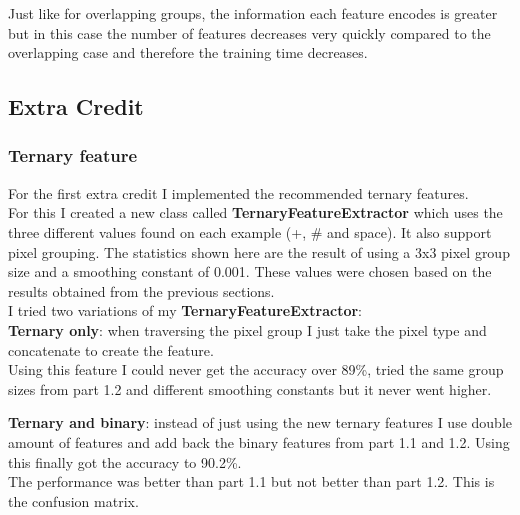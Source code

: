\documentclass[11pt]{article}
\begin{document}
Just like for overlapping groups, the information each feature encodes is greater but in this case the number of features decreases very quickly compared to the overlapping case and therefore the training time decreases.

\subsection*{Extra Credit}

\subsubsection*{Ternary feature}

For the first extra credit I implemented the recommended ternary features. \\
For this I created a new class called \textbf{TernaryFeatureExtractor} which uses the three different values found on each example (+, \# and space). It also support pixel grouping. The statistics shown here are the result of using a 3x3 pixel group size and a smoothing constant of 0.001. These values were chosen based on the results obtained from the previous sections.\\

I tried two variations of my \textbf{TernaryFeatureExtractor}:\\
\textbf{Ternary only}: when traversing the pixel group I just take the pixel type and concatenate to create the feature.\\
Using this feature I could never get the accuracy over 89\%, tried the same group sizes from part 1.2 and different smoothing constants but it never went higher.

\textbf{Ternary and binary}: instead of just using the new ternary features I use double amount of features and add back the binary features from part 1.1 and 1.2. Using this finally got the accuracy to 90.2\%. \\

The performance was better than part 1.1 but not better than part 1.2. This is the confusion matrix.\\
\end{document}

